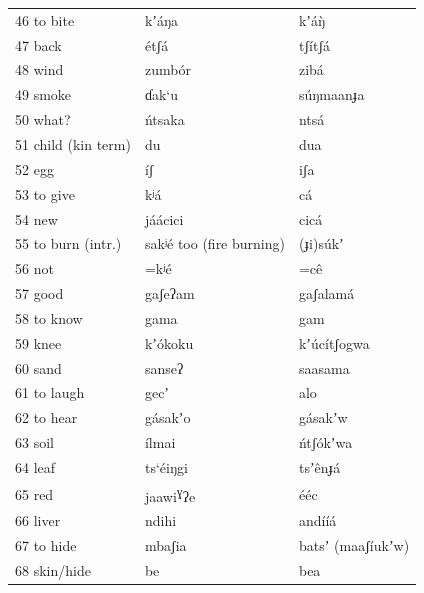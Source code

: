 \documentclass[output=paper]{langsci/langscibook}
\begin{document}
\begin{longtable}{p{}  p{} p{}}
46 to bite & kʼáŋa & kʼáŋ̀ \\

47 back & étʃá & tʃítʃá  \\ 

48 wind & zumb\'{o}r & zibá \\

49 smoke & ɗak‘u & s\'{u}ŋmaanɟa\\

50 what? & \'{n}tsaka & ntsá \\

51 child (kin term) & du & dua \\

52 egg & íʃ & iʃa \\

53 to give & kʲá & cá \\

54 new & jáácici & cicá \\

55 to burn (intr.) & sakʲé  too  (fire burning) & (ɟi)s\'{u}kʼ \\

56 not & =kʲé & =c\^{e} \\

57 good & gaʃeʔam & gaʃalamá \\

58 to know & gama & gam \\

59 knee & kʼ\'{o}koku & kʼ\'{u}cítʃogwa \\

60 sand & sanseʔ & saasama \\

61 to laugh & gecʼ & alo \\

62 to hear & gásakʼo & gásakʼw \\

63 soil & ílmai & \'{n}tʃ\'{o}kʼwa \\

64 leaf & ts‘éiŋgi & tsʼ\^{e}nɟá \\

65 red & jaawi\textsuperscript{ɣ}ʔe & ééc \\

66 liver & ndihi & andííá \\

67 to hide & mbaʃia & batsʼ (maaʃíukʼw) \\

68 skin/hide & be & bea \\


\end{longtable}
\end{document}
